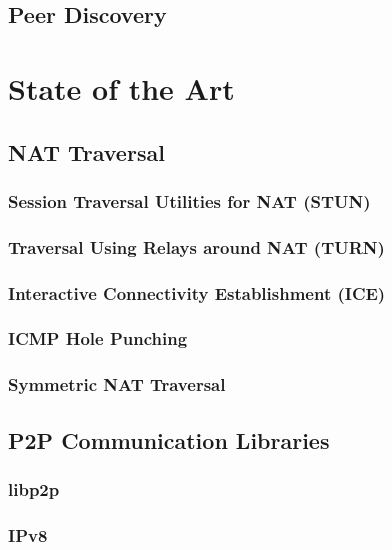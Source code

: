 
\section{Peer Discovery}


\chapter{State of the Art}

\section{NAT Traversal}

\subsection{Session Traversal Utilities for NAT (STUN)}

\subsection{Traversal Using Relays around NAT (TURN)}

\subsection{Interactive Connectivity Establishment (ICE)}

\subsection{ICMP Hole Punching}

\subsection{Symmetric NAT Traversal}

\section{P2P Communication Libraries}

\subsection{libp2p}

\subsection{IPv8}


